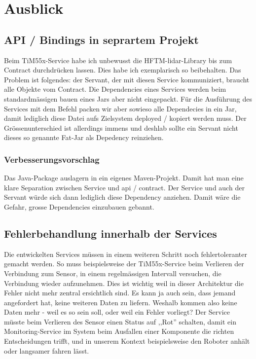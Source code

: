 \chapter{Ausblick}
\section{API / Bindings in seprartem Projekt}
\label{sec:separatebindings}
Beim TiM55x-Service habe ich unbewusst die HFTM-\acrshort{lidar}-Library bis zum Contract durchdrücken lassen. Dies habe ich exemplarisch so beibehalten. Das Problem ist folgendes: der Servant, der mit diesen Service kommuniziert, braucht alle Objekte vom Contract. Die Dependencies eines Services werden beim standardmässigen bauen eines Jars aber nicht eingepackt. Für die Ausführung des Services mit dem Befehl  packen wir aber sowieso alle Dependecies in ein Jar, damit lediglich diese Datei aufs Zielsystem deployed / kopiert werden muss. Der Grössenunterschied ist allerdings immens und deshlab sollte ein Servant nicht dieses so genannte Fat-Jar als Depedency reinziehen.

\subsection{Verbesserungsvorschlag}
Das Java-Package  auslagern in ein eigenes Maven-Projekt. Damit hat man eine klare Separation zwischen Service und \acrshort{api} / \Gls{contract}. Der Service und auch der Servant würde sich dann lediglich diese Dependency anziehen. Damit wäre die Gefahr, grosse Dependencies einzubauen gebannt.

\section{Fehlerbehandlung innerhalb der Services}
Die entwickelten Services müssen in einem weiteren Schritt noch fehlertoleranter gemacht werden. So muss beispielsweise der TiM55x-Service beim Verlieren der Verbindung zum Sensor, in einem regelmässigen Intervall versuchen, die Verbindung wieder aufzunehmen. Dies ist wichtig weil in dieser Architektur die Fehler nicht mehr zentral ersichtlich sind. Es kann ja auch sein, dass jemand angefordert hat, keine weiteren Daten zu liefern. Weshalb kommen also keine Daten mehr - weil es so sein soll, oder weil ein Fehler vorliegt? Der Service müsste beim Verlieren des Sensor einen Status auf ,,Rot'' schalten, damit ein Monitoring-Service im System beim Ausfallen einer Komponente die richten Entscheidungen trifft, und in unserem Kontext beispielsweise den Roboter anhält oder langsamer fahren lässt.

